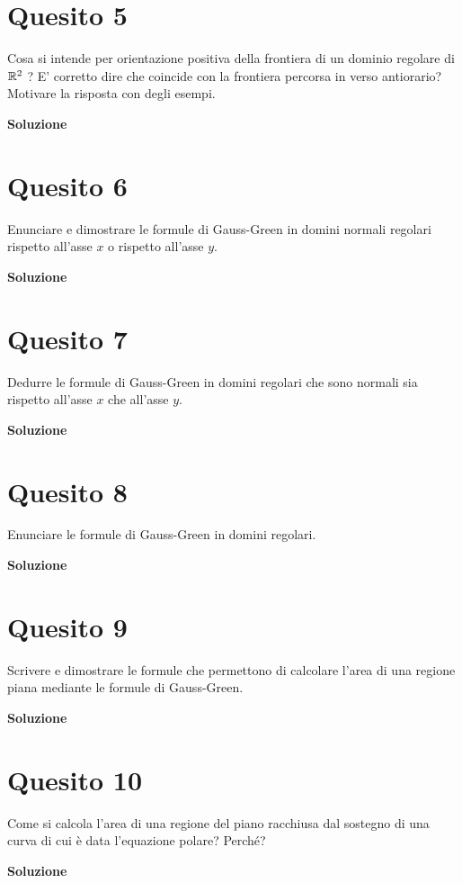 \section*{Quesito 5}
Cosa si intende per orientazione positiva della frontiera di un dominio regolare
di $\mathbb{R}^2$ ? E’ corretto dire che coincide con la frontiera percorsa in verso antiorario? Motivare
la risposta con degli esempi.

\medskip
\begin{large}
\textbf{Soluzione}
\end{large}


\section*{Quesito 6}
Enunciare e dimostrare le formule di Gauss-Green in domini normali regolari
rispetto all’asse $x$ o rispetto all’asse $y$.

\medskip
\begin{large}
\textbf{Soluzione}
\end{large}


\section*{Quesito 7}
Dedurre le formule di Gauss-Green in domini regolari che sono normali sia
rispetto all’asse $x$ che all’asse $y$.


\medskip
\begin{large}
\textbf{Soluzione}
\end{large}


\section*{Quesito 8}
Enunciare le formule di Gauss-Green in domini regolari.

\medskip
\begin{large}
\textbf{Soluzione}
\end{large}


\section*{Quesito 9}
Scrivere e dimostrare le formule che permettono di calcolare l’area di una
regione piana mediante le formule di Gauss-Green.

\medskip
\begin{large}
\textbf{Soluzione}
\end{large}


\section*{Quesito 10}
Come si calcola l’area di una regione del piano racchiusa dal sostegno di una
curva di cui è data l’equazione polare? Perché?

\medskip
\begin{large}
\textbf{Soluzione}
\end{large}
